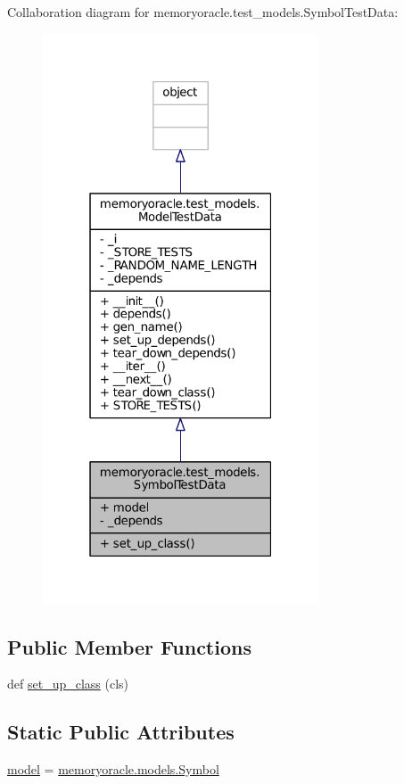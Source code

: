 Collaboration diagram for memoryoracle.\+test\+\_\+models.\+Symbol\+Test\+Data\+:\nopagebreak
\begin{figure}[H]
\begin{center}
\leavevmode
\includegraphics[width=232pt]{classmemoryoracle_1_1test__models_1_1SymbolTestData__coll__graph}
\end{center}
\end{figure}
\subsection*{Public Member Functions}
\begin{DoxyCompactItemize}
\item 
def \hyperlink{classmemoryoracle_1_1test__models_1_1SymbolTestData_afca33665e3d8a725b1a17fa0fbbcb062}{set\+\_\+up\+\_\+class} (cls)
\end{DoxyCompactItemize}
\subsection*{Static Public Attributes}
\begin{DoxyCompactItemize}
\item 
\hyperlink{classmemoryoracle_1_1test__models_1_1SymbolTestData_a826f1c1d428e181ce79166814bf29c79}{model} = \hyperlink{classmemoryoracle_1_1models_1_1Symbol}{memoryoracle.\+models.\+Symbol}
\end{DoxyCompactItemize}
